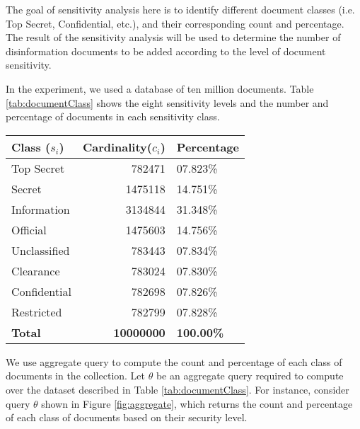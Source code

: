 The goal of sensitivity analysis here is to identify different document classes (i.e. Top Secret, Confidential, etc.), and their corresponding count and percentage. The result of the sensitivity analysis will be used to determine the number of disinformation documents to be added according to the level of document sensitivity. 

In the experiment, we used a database of ten million documents. Table \ref{tab:documentClass} shows the eight sensitivity levels and the number and percentage of documents in each sensitivity class.   

\begin{table*}[htp]
\caption{Document classification}
\label{tab:documentClass}
\centering
\begin{tabular}{lrl}
\toprule
\textbf{Class ($s_i$)} & \textbf{Cardinality($c_i$)} & \textbf{Percentage}\\
\midrule
Top Secret  & 782471  & 07.823\%  \\ 
Secret      & 1475118 & 14.751\% \\
Information & 3134844 & 31.348\% \\
Official    & 1475603 & 14.756\% \\
Unclassified& 783443  & 07.834\% \\
Clearance   & 783024  & 07.830\% \\
Confidential& 782698  & 07.826\% \\
Restricted  & 782799  & 07.828\% \\
\midrule
\textbf{Total}  & \textbf{10000000}  & \textbf{100.00\%} \\
\bottomrule
\end{tabular}
\end{table*}

We use aggregate query to compute the count and percentage of each class of documents in the collection. Let $\theta$ be an aggregate query required to compute over the dataset described in Table \ref{tab:documentClass}. For instance, consider query $\theta$ shown in Figure \ref{fig:aggregate}, which returns the count and percentage of each class of documents based on their security level.




